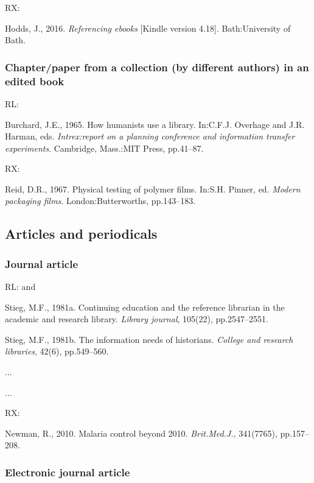 RX: \cite{hodds2016re}

Hodds, J., 2016. \emph{Referencing ebooks} [Kindle version 4.18]. Bath:\@ University of Bath.



\subsubsection*{Chapter\slash paper from a collection (by different authors) in an edited book}

RL: \cite{burchard1965hhl}

Burchard, J.E., 1965. How humanists use a library. In:\@ C.F.J. Overhage and J.R. Harman, eds. \emph{Intrex:\@ report on a planning conference and information transfer experiments}. Cambridge, Mass.:\@ MIT Press, pp.41--87.


RX: \cite{reid1967ptp}

Reid, D.R., 1967. Physical testing of polymer films. In:\@ S.H. Pinner, ed. \emph{Modern packaging films}. London:\@ Butterworths, pp.143--183.



\subsection{Articles and periodicals}

\subsubsection*{Journal article}

RL: \cite{stieg1981cer} and \cite{stieg1981inh}

Stieg, M.F., 1981a. Continuing education and the reference librarian in the academic and research library. \emph{Library journal}, 105(22), pp.2547--2551.

Stieg, M.F., 1981b. The information needs of historians. \emph{College and research libraries}, 42(6), pp.549--560.

...


...

RX: \cite{newman2010mcb}

Newman, R., 2010. Malaria control beyond 2010. \emph{Brit.\@ Med.\@ J.}, 341(7765), pp.157--208.



\subsubsection*{Electronic journal article}

